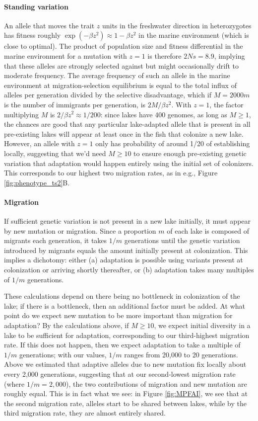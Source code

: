 \documentclass{article}
\begin{document}
\paragraph{Standing variation}
An allele that moves the trait $z$ units in the freshwater direction in heterozygotes has fitness roughly $\exp(-\beta z^2) \approx 1 - \beta z^2$ in the marine environment (which is close to optimal). The product of population size and fitness differential in the marine environment for a mutation with $z=1$ is therefore $2Ns = 8.9$, implying that these alleles are strongly selected against but might occasionally drift to moderate frequency. The average frequency of such an allele in the marine environment at migration-selection equilibrium is equal to the total influx of alleles per generation divided by the selective disadvantage, which if $M = 2000 m$ is the number of immigrants per generation, is $2 M / \beta z^2$. With $z=1$, the factor multiplying $M$ is $2/\beta z^2 \approx 1/200$: since lakes have 400 genomes, as long as $M \ge 1$, the chances are good that any particular lake-adapted allele that is present in all pre-existing lakes will appear at least once in the fish that colonize a new lake. However, an allele with $z=1$ only has probability of around 1/20 of establishing locally, suggesting that we'd need $M \ge 10$ to ensure enough pre-existing genetic variation that adaptation would happen entirely using the initial set of colonizers. This corresponds to our highest two migration rates, as in e.g., Figure \ref{fig:phenotype_ts2}B.

\paragraph{Migration}
If sufficient genetic variation is not present in a new lake initially, it must appear by new mutation or migration. Since a proportion $m$ of each lake is composed of migrants each generation, it takes $1/m$ generations until the genetic variation introduced by migrants equals the amount initially present at colonization. This implies a dichotomy: either (a) adaptation is possible using variants present at colonization or arriving shortly thereafter, or (b) adaptation takes many multiples of $1/m$ generations.

These calculations depend on there being no bottleneck in colonization of the lake; if there is a bottleneck, then an additional factor must be added. At what point do we expect new mutation to be more important than migration for adaptation? By the calculations above, if $M \ge 10$, we expect initial diversity in a lake to be sufficient  for adaptation, corresponding to our third-highest migration rate. If this does not happen, then we expect adaptation to take a multiple of $1/m$ generations;
with our values, $1/m$ ranges from 20,000 to 20 generations. Above we estimated that adaptive alleles due to new mutation fix locally about every 2,000 generations, suggesting that at our second-lowest migration rate (where $1/m = 2,000$), the two contributions of migration and new mutation are roughly equal.
This is in fact what we see: in Figure \ref{fig:MPFAI}, we see that at the second migration rate, alleles start to be shared between lakes, while by the third migration rate, they are almost entirely shared.
\end{document}
